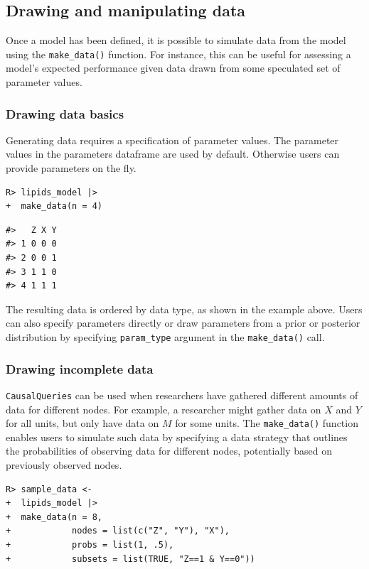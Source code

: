 \documentclass[
  11pt,
  article]{jss}
\begin{document}
\subsection{Drawing and manipulating
data}\label{drawing-and-manipulating-data}

Once a model has been defined, it is possible to simulate data from the
model using the \texttt{make\_data()} function. For instance, this can
be useful for assessing a model's expected performance given data drawn
from some speculated set of parameter values.

\subsubsection{Drawing data basics}\label{drawing-data-basics}

Generating data requires a specification of parameter values. The
parameter values in the parameters dataframe are used by default.
Otherwise users can provide parameters on the fly.

\begin{verbatim}
R> lipids_model |> 
+  make_data(n = 4)
\end{verbatim}

\begin{verbatim}
#>   Z X Y
#> 1 0 0 0
#> 2 0 0 1
#> 3 1 1 0
#> 4 1 1 1
\end{verbatim}

The resulting data is ordered by data type, as shown in the example
above. Users can also specify parameters directly or draw parameters
from a prior or posterior distribution by specifying
\texttt{param\_type} argument in the \texttt{make\_data()} call.

\subsubsection{Drawing incomplete data}\label{drawing-incomplete-data}

\texttt{CausalQueries} can be used when researchers have gathered
different amounts of data for different nodes. For example, a researcher
might gather data on \(X\) and \(Y\) for all units, but only have data
on \(M\) for some units. The \texttt{make\_data()} function enables
users to simulate such data by specifying a data strategy that outlines
the probabilities of observing data for different nodes, potentially
based on previously observed nodes.

\begin{verbatim}
R> sample_data <-
+  lipids_model |>
+  make_data(n = 8,
+            nodes = list(c("Z", "Y"), "X"),
+            probs = list(1, .5),
+            subsets = list(TRUE, "Z==1 & Y==0"))
\end{verbatim}
\end{document}
